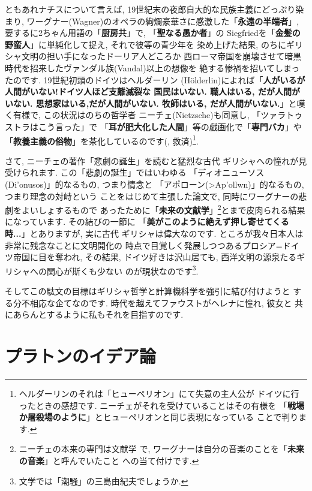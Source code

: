 \documentclass[b5j,8pt,twocolumn]{ltjsarticle}
\newcommand{\textgreek}[1]{\begingroup\fontencoding{LGR}\selectfont#1\endgroup}
\newcommand{\textgreek}[1]{\begingroup\fontencoding{LGR}\selectfont#1\endgroup}
\begin{document}
ともあれナチスについて言えば, 19世紀末の夜郎自大的な民族主義にどっぷり染まり,
 ワーグナー(Wagner)のオペラの絢爛豪華さに感激した「\textbf{永遠の半端者}」,
 要するに2ちゃん用語の「\textbf{厨房共}」で, 「\textbf{聖なる愚か者}」の
Siegfriedを「\textbf{金髪の野蛮人}」に単純化して捉え, それで彼等の青少年を
染め上げた結果, のちにギリシャ文明の担い手になったドーリア人どころか
西ローマ帝国を崩壊させて暗黒時代を招来したヴァンダル族(Vandal)以上の想像を
絶する惨禍を招いてしまったのです. 19世紀初頭のドイツはヘルダーリン
(H\"olderlin)によれば「\textbf{人がいるが人間がいない!ドイツ人ほど支離滅裂な
国民はいない. 職人はいる, だが人間がいない. 思想家はいる,だが人間がいない.
 牧師はいる, だが人間がいない.}」と嘆く有様で,  この状況はのちの哲学者
 ニーチェ(Nietzsche)も同意し, 「ツァラトゥストラはこう言った」で
 「\textbf{耳が肥大化した人間}」等の戯画化で「\textbf{専門バカ}」や
「\textbf{教養主義の俗物}」を茶化しているのです(\cite{ツァラトゥストラ},
救済)\footnote{ヘルダーリンのそれは「ヒューペリオン」にて失意の主人公が
ドイツに行ったときの感想です. ニーチェがそれを受けていることはその有様を
「\textbf{戦場か屠殺場のように}」とヒューペリオンと同じ表現になっている
ことで判ります.}.
\newline

さて, ニーチェの著作「悲劇の誕生」\cite{悲劇の誕生}を読むと猛烈な古代
ギリシャへの憧れが見受けられます. この「悲劇の誕生」ではいわゆる
「ディオニューソス(\textgreek{Di'onusos})」的なるもの, つまり情念と
「アポローン(\textgreek{>Ap'ollwn})」的なるもの, つまり理念の対峙という
ことをはじめて主張した論文で, 同時にワーグナーの悲劇をよいしょするもので
あったために「\textbf{未来の文献学}」\footnote{ニーチェの本来の専門は文献学
で, ワーグナーは自分の音楽のことを「\textbf{未来の音楽}」と呼んでいたこと
への当て付けです.}とまで皮肉られる結果になっています. その結びの一節に
「\textbf{美がこのように絶えず押し寄せてくる時...}」とありますが, 実に古代
ギリシャは偉大なのです. ところが我々日本人は非常に残念なことに文明開化の
時点で目覚しく発展しつつあるプロシア=ドイツ帝国に目を奪われ, その結果,
 ドイツ好きは沢山居ても, 西洋文明の源泉たるギリシャへの関心が斯くも少ない
のが現状なのです\footnote{文学では「潮騒」の三島由紀夫でしょうか.}.
\newline

そしてこの駄文の目標はギリシャ哲学と計算機科学を強引に結び付けようと
する分不相応な企てなのです. 時代を越えてファウストがヘレナに憧れ, 彼女と
共にあらんとするように私もそれを目指すのです. 

\section{プラトンのイデア論}
\end{document}
